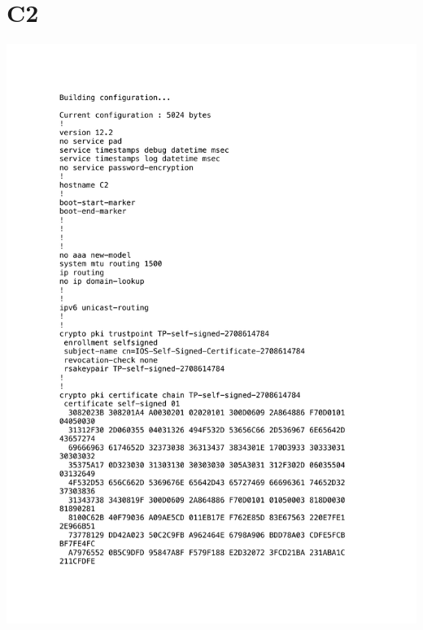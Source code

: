 \documentclass[11pt,a4paper]{scrreprt}
\begin{document}
\section{C2}
\vspace{-1cm}
\includegraphics[height=\dimexpr\textheight-4\baselineskip\relax,page=1]{../config_files/C2.pdf}

\end{document}
